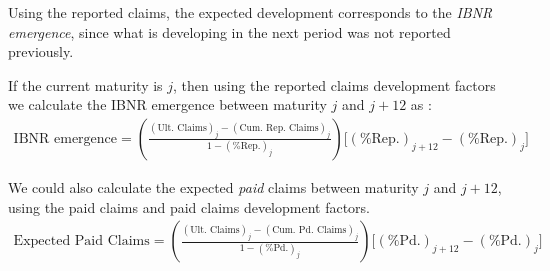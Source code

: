 \documentclass[11pt, english]{memoir}
\numberwithin{definition}{section}
\begin{document}
Using the reported claims, the expected development corresponds to the \emph{IBNR emergence}, since what is developing in the next period was not reported previously. 

If the current maturity is $ j $, then using the reported claims development factors we calculate the IBNR emergence between maturity $ j $ and $ j+12 $ as : 
\begin{align*}
\text{IBNR emergence} = \left(\frac{(\text{Ult. Claims})_{j} - (\text{Cum. Rep. Claims})_{j}}{1 - (\text{\% Rep.})_{j}}\right)\Big[(\text{\% Rep.})_{j+ 12} - (\text{\% Rep.})_{j} \Big]
\end{align*} 

	
We could also calculate the expected \emph{paid} claims between maturity $ j $ and $ j + 12 $, using the paid claims and paid claims development factors. 
\begin{align*}
\text{Expected Paid Claims} = \left(\frac{(\text{Ult. Claims})_{j} - (\text{Cum. Pd. Claims})_{j}}{1 - (\text{\% Pd.})_{j}}\right)\Big[(\text{\% Pd.})_{j+ 12} - (\text{\% Pd.})_{j} \Big]
\end{align*} 
	
	
	
	
	
	
	
	
	
	
	
	
	
	
	
	
	
	
	
	
	
	
	
	
	
	
	
	
\end{document}

